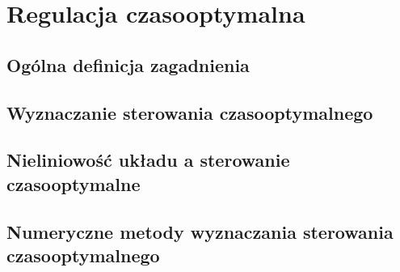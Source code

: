 \section{Regulacja czasooptymalna}
\label{sec:toc}

\subsection{Ogólna definicja zagadnienia}
\label{sub:toc-def}


\subsection{Wyznaczanie sterowania czasooptymalnego}
\label{sub:toc-ctrl}


\subsection{Nieliniowość układu a sterowanie czasooptymalne}
\label{sub:toc-nonlnr}


\subsection{Numeryczne metody wyznaczania sterowania czasooptymalnego}
\label{sub:toc-num}